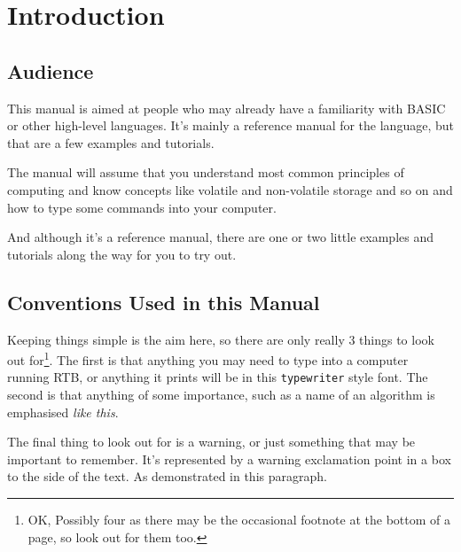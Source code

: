 \chapter{Introduction}
\section{Audience}
This manual is aimed at people who may already have a familiarity with
BASIC or other high-level languages. It's mainly a reference manual
for the language, but that are a few examples and tutorials.

The manual will assume that you understand most common principles
of computing and know concepts like volatile and non-volatile storage
and so on and how to type some commands into your computer.

And although it's a reference manual, there are one or two little
examples and tutorials along the way for you to try out.

\section{Conventions Used in this Manual}
Keeping things simple is the aim here, so there are only really 3
things to look out for\footnote{OK, Possibly four as there may be
the occasional footnote at the bottom of a page, so look out for them
too.}. The first is that anything you may need to type into a computer
running RTB, or anything it prints will be in this {\tt typewriter}
style font. The second is that anything of some importance, such as a
name of an algorithm is emphasised {\em like this}.

The \meek final thing to look out for is a warning, or just something
that may be important to remember. It's represented by a warning
exclamation point in a box to the side of the text. As demonstrated in
this paragraph.\newpage
{}

